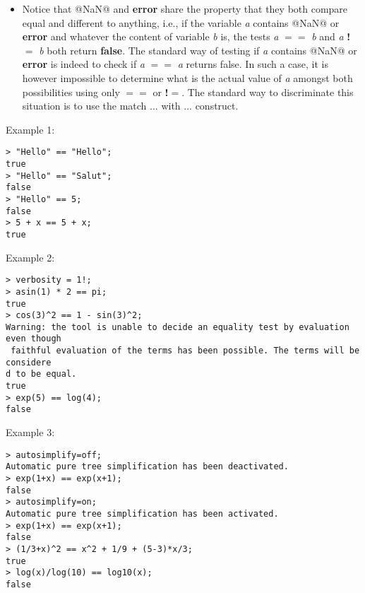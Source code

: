 \begin{itemize}
\item Notice that @NaN@ and \textbf{error} share the property that they both compare equal
   and different to anything, i.e., if the variable \emph{a} contains @NaN@ or \textbf{error}
   and whatever the content of variable \emph{b} is, the tests \emph{a} \textbf{$==$} \emph{b} and
   \emph{a} \textbf{!$=$} \emph{b} both return \textbf{false}. The standard way of testing if \emph{a} contains
   @NaN@ or \textbf{error} is indeed to check if \emph{a} \textbf{$==$} \emph{a} returns false. In such a
   case, it is however impossible to determine what is the actual value of \emph{a}
   amongst both possibilities using only \textbf{$==$} or \textbf{!$=$}. The standard way to
   discriminate this situation is to use the match ... with ... construct.
\end{itemize}
\noindent Example 1: 
\begin{center}\begin{minipage}{15cm}\begin{Verbatim}[frame=single,commandchars=\\\|\~]
> "Hello" == "Hello";
true
> "Hello" == "Salut";
false
> "Hello" == 5;
false
> 5 + x == 5 + x;
true
\end{Verbatim}
\end{minipage}\end{center}
\noindent Example 2: 
\begin{center}\begin{minipage}{15cm}\begin{Verbatim}[frame=single,commandchars=\\\|\~]
> verbosity = 1!;
> asin(1) * 2 == pi;
true
> cos(3)^2 == 1 - sin(3)^2;
Warning: the tool is unable to decide an equality test by evaluation even though
 faithful evaluation of the terms has been possible. The terms will be considere
d to be equal.
true
> exp(5) == log(4);
false
\end{Verbatim}
\end{minipage}\end{center}
\noindent Example 3: 
\begin{center}\begin{minipage}{15cm}\begin{Verbatim}[frame=single,commandchars=\\\|\~]
> autosimplify=off;
Automatic pure tree simplification has been deactivated.
> exp(1+x) == exp(x+1);
false
> autosimplify=on;
Automatic pure tree simplification has been activated.
> exp(1+x) == exp(x+1);
false
> (1/3+x)^2 == x^2 + 1/9 + (5-3)*x/3;
true
> log(x)/log(10) == log10(x);
false
\end{Verbatim}
\end{minipage}\end{center}
